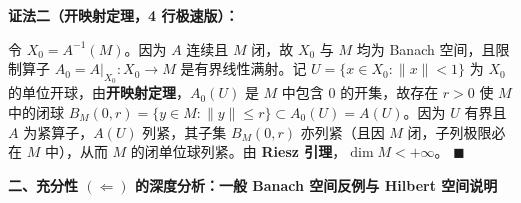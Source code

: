 \documentclass[11pt,a4paper]{article}
\newcommand{\SoftDivider}{%
  \par\vspace{5pt}\noindent\makebox[\linewidth][c]{\textcolor{BorderColor}{\rule{0.38\linewidth}{0.6pt}}}\par\vspace{5pt}%
}
\begin{document}
\SoftDivider

\textbf{证法二（开映射定理，4 行极速版）：}

令 \(X_0 = A^{-1}(M)\)。因为 \(A\) 连续且 \(M\) 闭，故 \(X_0\) 与 \(M\) 均为 Banach 空间，且限制算子 \(A_0 = A|_{X_0}: X_0 \to M\) 是有界线性满射。记 \(U = \{x \in X_0 : \|x\| < 1\}\) 为 \(X_0\) 的单位开球，由\textbf{开映射定理}，\(A_0(U)\) 是 \(M\) 中包含 \(0\) 的开集，故存在 \(r > 0\) 使 \(M\) 中的闭球 \(B_M(0, r) = \{y \in M : \|y\| \le r\} \subset A_0(U) = A(U)\)。因为 \(U\) 有界且 \(A\) 为紧算子，\(A(U)\) 列紧，其子集 \(B_M(0, r)\) 亦列紧（且因 \(M\) 闭，子列极限必在 \(M\) 中），从而 \(M\) 的闭单位球列紧。由 \textbf{Riesz 引理}，\(\dim M < +\infty\)。 \(\blacksquare\)

\SoftDivider

\textbf{二、充分性 \((\Leftarrow)\) 的深度分析：一般 Banach 空间反例与 Hilbert 空间说明}
\end{document}
